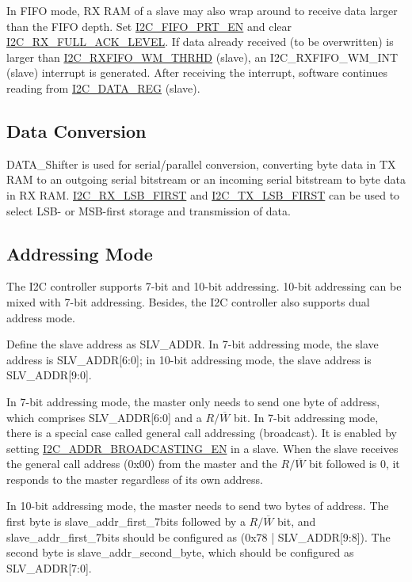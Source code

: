 \documentclass[main\_\_EN.tex]{subfiles}
\begin{document}
In FIFO mode, RX RAM of a slave may also wrap around to receive data larger than the FIFO depth. Set \hyperref[fielddesc:I2CFIFOPRTEN]{I2C\_FIFO\_PRT\_EN} and clear \hyperref[fielddesc:I2CRXFULLACKLEVEL]{I2C\_RX\_FULL\_ACK\_LEVEL}. If data already received (to be overwritten) is larger than \hyperref[fielddesc:I2CRXFIFOWMTHRHD]{I2C\_RXFIFO\_WM\_THRHD} (slave), an I2C\_RXFIFO\_WM\_INT (slave) interrupt is generated. After receiving the interrupt, software continues reading from \hyperref[regdesc:I2CDATAREG]{I2C\_DATA\_REG} (slave).

\subsection{Data Conversion}
DATA\_Shifter is used for serial/parallel conversion, converting byte data in TX RAM to an outgoing serial bitstream or an incoming serial bitstream to byte data in RX RAM. \hyperref[fielddesc:I2CRXLSBFIRST]{I2C\_RX\_LSB\_FIRST} and \hyperref[fielddesc:I2CTXLSBFIRST]{I2C\_TX\_LSB\_FIRST} can be used to select LSB- or MSB-first storage and transmission of data.

\subsection{Addressing Mode}
The \chipname{} I2C controller supports 7-bit and 10-bit addressing. 10-bit addressing can be mixed with 7-bit addressing. Besides, the \chipname{} I2C controller also supports dual address mode.

Define the slave address as SLV\_ADDR. In 7-bit addressing mode, the slave address is SLV\_ADDR[6:0]; in 10-bit addressing mode, the slave address is SLV\_ADDR[9:0].

In 7-bit addressing mode, the master only needs to send one byte of address, which comprises SLV\_ADDR[6:0] and a $R/\overline W$ bit. In 7-bit addressing mode, there is a special case called general call addressing (broadcast). It is enabled by setting \hyperref[fielddesc:I2CADDRBROADCASTINGEN]{I2C\_ADDR\_BROADCASTING\_EN} in a slave. When the slave receives the general call address (0x00) from the master and the $R/\overline W$ bit followed is 0, it responds to the master regardless of its own address.

In 10-bit addressing mode, the master needs to send two bytes of address. The first byte is slave\_addr\_first\_7bits followed by a $R/\overline W$ bit, and slave\_addr\_first\_7bits should be configured as (0x78 | SLV\_ADDR[9:8]). The second byte is slave\_addr\_second\_byte, which should be configured as SLV\_ADDR[7:0]. 
\end{document}
